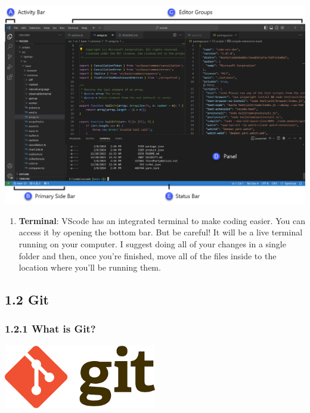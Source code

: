 \documentclass[
  paper=a4,
  ,captions=tableheading
]{scrbook}
\providecommand{\tightlist}{%
  \setlength{\itemsep}{0pt}\setlength{\parskip}{0pt}}
\let\origfigure\figure
\let\endorigfigure\endfigure
\renewenvironment{figure}[1][2] {
    \expandafter\origfigure\expandafter[H]
} {
    \endorigfigure
}
\begin{document}
\begin{figure}
\centering
\includegraphics{./tex2pdf.-45885137cafe410a/adee506e3181b674ae69ce0359aac367163803c0.png}
\caption{VScode components}
\end{figure}

\begin{enumerate}
\def\labelenumi{\arabic{enumi}.}
\setcounter{enumi}{2}
\tightlist
\item
  \textbf{Terminal}: VScode has an integrated terminal to make coding
  easier. You can access it by opening the bottom bar. But be careful!
  It will be a live terminal running on your computer. I suggest doing
  all of your changes in a single folder and then, once you're finished,
  move all of the files inside to the location where you'll be running
  them.
\end{enumerate}

\hypertarget{git}{%
\subsection{1.2 Git}\label{git}}

\hypertarget{what-is-git}{%
\subsubsection{1.2.1 What is Git?}\label{what-is-git}}

\begin{figure}
\centering
\includegraphics[width=0.5\textwidth,height=\textheight]{./tex2pdf.-45885137cafe410a/b7be8868d46c63c4c032489b59e6c1abdb12b3cc.png}
\caption{Git's logo}
\end{figure}
\end{document}
